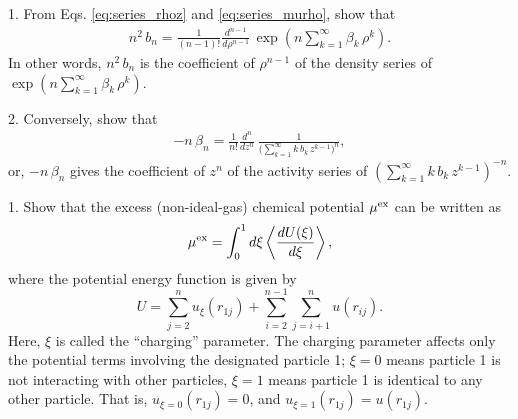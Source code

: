 \documentclass{book}
\begin{document}






1. From Eqs. \eqref{eq:series_rhoz} and \eqref{eq:series_murho},
show that
\begin{align}
  n^2 \, b_n
=
  \frac{1} {(n - 1)!}
  \frac{ d^{n-1} } { d \rho^{n-1} }
  \,
  \exp
  \left(
  n \sum_{k = 1}^\infty \beta_k \, \rho^k
  \right).
\end{align}
In other words,
$n^2 \, b_n$
is the coefficient of $\rho^{n-1}$
of the density series of
$\exp \left( n \sum_{k = 1}^\infty \beta_k \, \rho^k \right)$.


2. Conversely, show that
\begin{align}
  -n \, \beta_n
=
  \frac{1} {n!}
  \frac{ d^{n} } { d z^{n} }
  \,
  \frac{1}
  {
  \bigl(
    \sum_{k = 1}^\infty k \, b_k \, z^{k-1}
  \bigr)^n
  },
\end{align}
or,
$-n \, \beta_n$
gives the coefficient of $z^n$
of the activity series of
$\left( \sum_{k = 1}^\infty k \, b_k \, z^{k-1} \right)^{-n}$.







1. Show that the excess (non-ideal-gas) chemical potential ${ { \mu }^{ \mathrm{ex} } }$ can be written as
\begin{equation}
  { { \mu }^{ \mathrm{ex} } }
=
  \int_0^1 d\xi \left\langle \frac{d U(\xi)}{d\xi} \right\rangle,
  \label{eq:muti}
\end{equation}
%
where the potential energy function is given by
\[
  U =
  \sum_{j = 2}^n u_\xi(r_{1j})
  +
  \sum_{i = 2}^{n - 1} \sum_{j = i+1}^n u(r_{ij}).
\]
%
Here, $\xi$ is called the ``charging'' parameter.
%
The charging parameter affects only the potential terms involving
the designated particle 1;
$\xi = 0$ means particle 1 is not interacting with other particles,
$\xi = 1$ means particle 1 is identical to any other particle.
%
That is,
$u_{\xi = 0}(r_{1j}) = 0$,
and
$u_{\xi = 1}(r_{1j}) = u(r_{1j})$.
\end{document}
